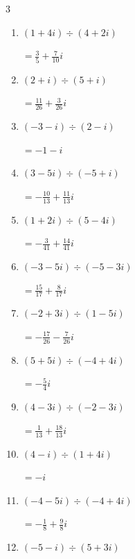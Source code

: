 \begin{multicols}{3}
\begin{enumerate}
        $\displaystyle =3-i$

\columnbreak %

\resetques

  \item $\displaystyle (1+4i)\div(4+2i)$

        $\displaystyle =\frac{3}{5}+\frac{7}{10}i$

  \item $\displaystyle (2+i)\div(5+i)$

        $\displaystyle =\frac{11}{26}+\frac{3}{26}i$

  \item $\displaystyle (-3-i)\div(2-i)$

        $\displaystyle =-1-i$

  \item $\displaystyle (3-5i)\div(-5+i)$

        $\displaystyle =-\frac{10}{13}+\frac{11}{13}i$

  \item $\displaystyle (1+2i)\div(5-4i)$

        $\displaystyle =-\frac{3}{41}+\frac{14}{41}i$

  \item $\displaystyle (-3-5i)\div(-5-3i)$

        $\displaystyle =\frac{15}{17}+\frac{8}{17}i$

  \item $\displaystyle (-2+3i)\div(1-5i)$

        $\displaystyle =-\frac{17}{26}-\frac{7}{26}i$

  \item $\displaystyle (5+5i)\div(-4+4i)$

        $\displaystyle =-\frac{5}{4}i$

  \item $\displaystyle (4-3i)\div(-2-3i)$

        $\displaystyle =\frac{1}{13}+\frac{18}{13}i$

  \item $\displaystyle (4-i)\div(1+4i)$

        $\displaystyle =-i$

\columnbreak %

  \item $\displaystyle (-4-5i)\div(-4+4i)$

        $\displaystyle =-\frac{1}{8}+\frac{9}{8}i$

  \item $\displaystyle (-5-i)\div(5+3i)$


\end{enumerate}
\end{multicols}
